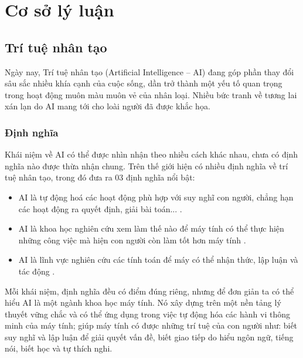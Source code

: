 \chapter{Cơ sở lý luận}

\section{Trí tuệ nhân tạo}
Ngày nay, Trí tuệ nhân tạo (Artificial Intelligence – AI) đang góp phần thay đổi sâu sắc nhiều khía cạnh của cuộc sống, dần trở thành một yếu tố quan trọng trong hoạt động muôn màu muôn vẻ của nhân loại. Nhiều bức tranh về tương lai xán lạn do AI mang tới cho loài người đã được khắc họa.\par

\subsection{Định nghĩa}
Khái niệm về AI có thể được nhìn nhận theo nhiều cách khác nhau, chưa có định nghĩa nào được thừa nhận chung. Trên thế giới hiện có nhiều định nghĩa về trí tuệ nhân tạo, trong đó \textcite{nguyen2018tri} đưa ra 03 định nghĩa nổi bật:
\begin{itemize}
	\item AI là tự động hoá các hoạt động phù hợp với suy nghĩ con người, chẳng hạn các hoạt động ra quyết định, giải bài toán... \parencite{bellman1978introduction}.
	\item AI là khoa học nghiên cứu xem làm thế nào để máy tính có thể thực hiện những công việc mà hiện con người còn làm tốt hơn máy tính \parencite{rich1991artificial}.
	\item AI là lĩnh vực nghiên cứu các tính toán để máy có thể nhận thức, lập luận và tác động \parencite{salin1992machine}.
\end{itemize}\par
Mỗi khái niệm, định nghĩa đều có điểm đúng riêng, nhưng để đơn giản ta có thể hiểu AI là một ngành khoa học máy tính. Nó xây dựng trên một nền tảng lý thuyết vững chắc và có thể ứng dụng trong việc tự động hóa các hành vi thông minh của máy tính; giúp máy tính có được những trí tuệ của con người như: biết suy nghĩ và lập luận để giải quyết vấn đề, biết giao tiếp do hiểu ngôn ngữ, tiếng nói, biết học và tự thích nghi.

